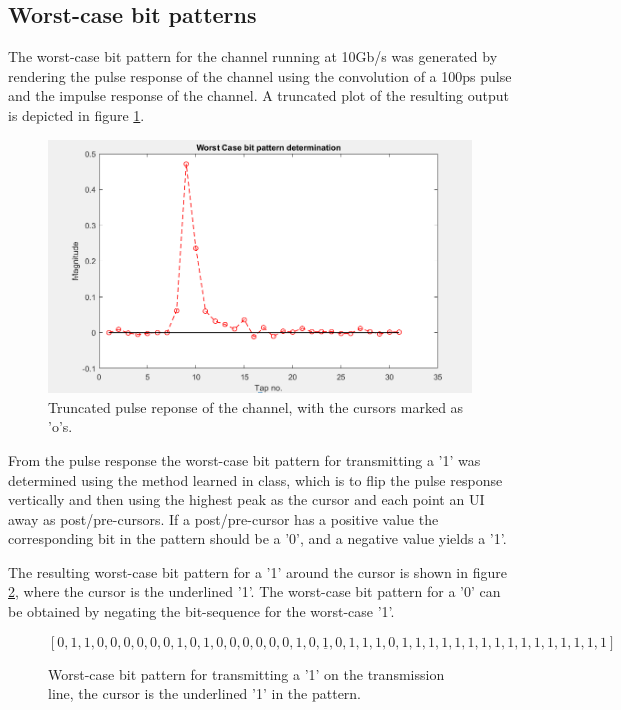 
\subsection{Worst-case bit patterns}

The worst-case bit pattern for the channel running at 10Gb/s was generated by rendering the pulse response of the channel using the convolution of a 100ps pulse and the impulse response of the channel. A truncated plot of the resulting output is depicted in figure \ref{fig:worst}.


\begin{figure}[ht!]
\begin{center}
\includegraphics[scale=0.8]{img/graph}
\caption{Truncated pulse reponse of the channel, with the cursors marked as 'o's.}
\label{fig:worst}
\end{center}
\end{figure}

From the pulse response the worst-case bit pattern for transmitting a 
'1' was determined using the method learned in class, which is to flip the pulse response vertically and then using the highest peak as the cursor and each point an UI away as post/pre-cursors. If a post/pre-cursor has a positive value the corresponding bit in the pattern should be a '0', and a negative value yields a '1'.

The resulting worst-case bit pattern for a '1' around the cursor is shown in figure \ref{eq:wc}, where the cursor is the underlined '1'. The worst-case bit pattern for a '0' can be obtained by negating the bit-sequence for the worst-case '1'.


\begin{figure}

$$\left[0,1,1,0,0,0,0,0,0,1,0,1,0,0,0,0,0,0,1,0,\underline{1},0,1,1,1,0,1,1,1,1,1,1,1,1,1,1,1,1,1,1,1,1\right]$$
\caption{Worst-case bit pattern for transmitting a '1' on the transmission line, the cursor is the underlined '1' in the pattern.}
\label{eq:wc}

\end{figure}



